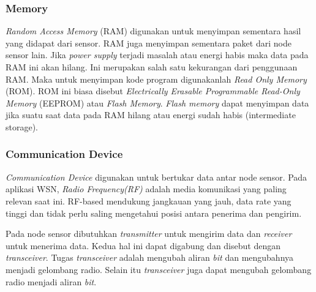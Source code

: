 \subsubsection{Memory}
\textit{Random Access Memory} (RAM) digunakan untuk menyimpan sementara hasil yang didapat dari sensor. RAM juga menyimpan sementara paket dari node sensor lain. Jika \textit{power supply} terjadi masalah atau energi habis maka data pada RAM ini akan hilang. Ini merupakan salah satu kekurangan dari penggunaan RAM. Maka untuk menyimpan kode program digunakanlah \textit{Read Only Memory} (ROM). ROM ini biasa disebut \textit{Electrically Erasable Programmable Read-Only Memory} (EEPROM) atau \textit{Flash Memory}. \textit{Flash memory} dapat menyimpan data jika suatu saat data pada RAM hilang atau energi sudah habis (intermediate storage).

\subsubsection{Communication Device}
\textit{Communication Device} digunakan untuk bertukar data antar node sensor. Pada aplikasi WSN, \textit{Radio Frequency(RF)} adalah media komunikasi yang paling relevan saat ini. RF-based mendukung jangkauan yang jauh, data rate yang tinggi dan tidak perlu saling mengetahui posisi antara penerima dan pengirim.

Pada node sensor dibutuhkan \textit{transmitter} untuk mengirim data dan \textit{receiver} untuk menerima data. Kedua hal ini dapat digabung dan disebut dengan \textit{transceiver}. Tugas \textit{transceiver} adalah mengubah aliran \textit{bit} dan mengubahnya menjadi gelombang radio. Selain itu \textit{transceiver} juga dapat mengubah gelombang radio menjadi aliran \textit{bit}.

